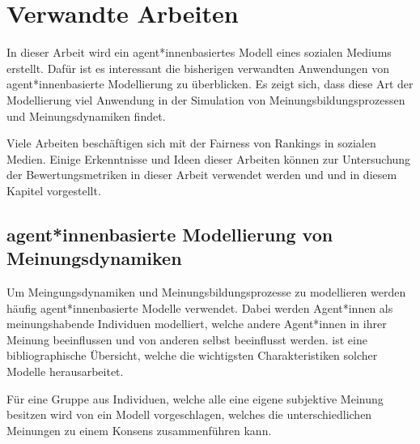 \chapter{Verwandte Arbeiten}


In dieser Arbeit wird ein agent*innenbasiertes Modell eines sozialen Mediums erstellt. Dafür ist es interessant die bisherigen verwandten Anwendungen von agent*innenbasierte Modellierung zu überblicken. Es zeigt sich, dass diese Art der Modellierung viel Anwendung in der Simulation von Meinungsbildungsprozessen und Meinungsdynamiken findet.

Viele Arbeiten beschäftigen sich mit der Fairness von Rankings in sozialen Medien. Einige Erkenntnisse und Ideen dieser Arbeiten können zur Untersuchung der Bewertungsmetriken in dieser Arbeit verwendet werden und und in diesem Kapitel vorgestellt.

\section{agent*innenbasierte Modellierung von Meinungsdynamiken}

Um Meingungsdynamiken und Meinungsbildungsprozesse zu modellieren werden häufig agent*innenbasierte Modelle verwendet. Dabei werden Agent*innen als meinungshabende Individuen modelliert, welche andere Agent*innen in ihrer Meinung beeinflussen und von anderen selbst beeinflusst werden. \cite{Mastroeni201958836} ist eine bibliographische Übersicht, welche die wichtigsten Charakteristiken solcher Modelle herausarbeitet.


Für eine Gruppe aus Individuen, welche alle eine eigene subjektive Meinung besitzen wird von \cite{Degroot1974118} ein Modell vorgeschlagen, welches die unterschiedlichen Meinungen zu einem Konsens zusammenführen kann.

